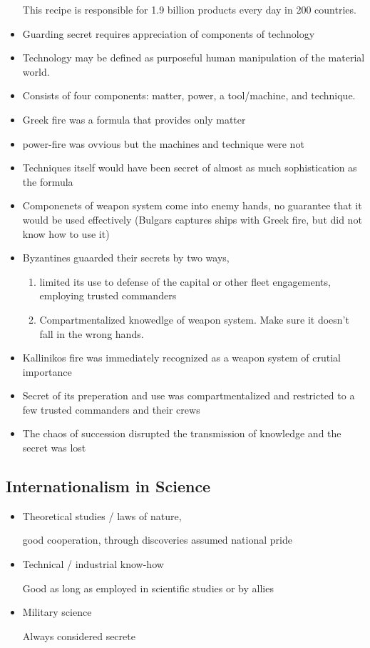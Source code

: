 \documentclass{article}
\begin{document}
\begin{itemize}
    This recipe is responsible for 1.9 billion products every day in 200 countries.
  \item Guarding secret requires appreciation of components of technology
  \item Technology may be defined as purposeful human manipulation of the material world.
  \item Consists of four components: matter, power, a tool/machine, and technique.
  \item Greek fire was a formula that provides only matter
  \item power-fire was ovvious but the machines and technique were not
  \item Techniques itself would have been secret of almost as much sophistication as the formula
  \item Componenets of weapon system come into enemy hands,
    no guarantee that it would be used effectively
    (Bulgars captures ships with Greek fire, but did not know how to use it)
  \item Byzantines guaarded their secrets by two ways,
    \begin{enumerate}
      \item limited its use to defense of the capital
        or other fleet engagements, employing trusted commanders
      \item Compartmentalized knowedlge of weapon system. Make sure it doesn't fall in the wrong hands.
    \end{enumerate}
  \item Kallinikos fire was immediately recognized as a weapon system of crutial importance
  \item Secret of its preperation and use was compartmentalized and restricted to a few
    trusted commanders and their crews
  \item The chaos of succession disrupted the transmission of knowledge
    and the secret was lost
\end{itemize}

\subsection{Internationalism in Science}
\begin{itemize}
  \item Theoretical studies / laws of nature,

    good cooperation, through discoveries assumed national pride
  \item Technical / industrial know-how

    Good as long as employed in scientific studies or by allies
  \item Military science

    Always considered secrete
\end{itemize}
\end{document}
